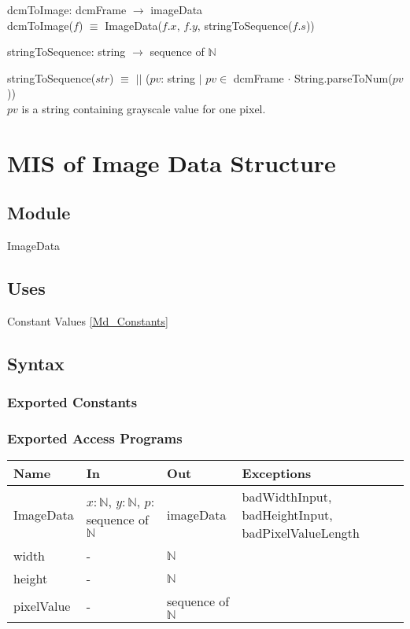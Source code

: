 \documentclass[12pt, titlepage]{article}
\begin{document}
\noindent dcmToImage: dcmFrame $\rightarrow$ imageData\\
\noindent dcmToImage($f$) $\equiv$ ImageData($f.x$, $f.y$,
stringToSequence($f.s$))

\noindent stringToSequence: string $\rightarrow$ sequence of $\mathbb{N}$

\noindent stringToSequence($str$) $\equiv$
$||$ ($pv$: string $|$ $pv \in$ dcmFrame $\cdot$ String.parseToNum($pv$))\\
$pv$ is a string containing grayscale value for one pixel.

\newpage

\section{MIS of Image Data Structure} \label{Md_ImageDS}
\subsection{Module}

ImageData

\subsection{Uses}

Constant Values \ref{Md_Constants}

\subsection{Syntax}

\subsubsection{Exported Constants}

\subsubsection{Exported Access Programs}

\begin{center}
\begin{tabular}{p{2cm} p{4cm} p{3cm} p{5cm}}
\hline
\textbf{Name} & \textbf{In} & \textbf{Out} & \textbf{Exceptions} \\
\hline
ImageData & $x: \mathbb{N}$, $y: \mathbb{N}$, $p$: sequence of $\mathbb{N}$ &
imageData & badWidthInput, badHeightInput, badPixelValueLength\\
width & - & $\mathbb{N}$\\
height & - & $\mathbb{N}$ & \\
pixelValue & - & sequence of $\mathbb{N}$\\
\hline
\end{tabular}
\end{center}
\end{document}

